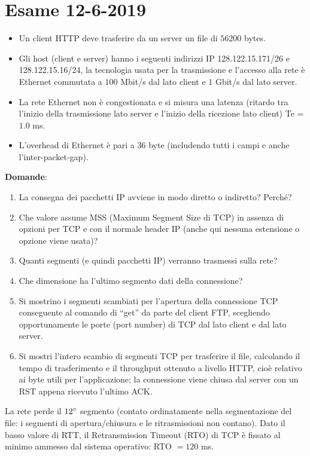 \documentclass[10pt]{article}
\begin{document}
	\section{Esame 12-6-2019}
	\begin{itemize}
	\item Un client HTTP deve trasferire da un server un file di $56200$ bytes. 
	\item Gli host (client e server) hanno i seguenti indirizzi IP 128.122.15.171/26 e 128.122.15.16/24, la tecnologia usata per la trasmissione e l'accesso alla rete è Ethernet commutata a $100$ Mbit/s dal lato client e $1$ Gbit/s dal lato server. 
	\item La rete Ethernet non è congestionata e si misura una latenza (ritardo tra l'inizio della trasmissione lato server e l'inizio della ricezione lato client) Te = $1.0$ ms. 
	\item L'overhead di Ethernet è pari a $36$ byte (includendo tutti i campi e anche l'inter-packet-gap).
	\end{itemize}
	\textbf{Domande}:
	\begin{enumerate}
		\item La consegna dei pacchetti IP avviene in modo diretto o indiretto? Perché?
		\item Che valore assume MSS (Maximum Segment Size di TCP) in assenza di opzioni per TCP e con il normale header IP (anche qui nessuna estensione o opzione viene usata)?
		\item Quanti segmenti (e quindi pacchetti IP) verranno trasmessi sulla rete?
		\item Che dimensione ha l'ultimo segmento dati della connessione?
		\item Si mostrino i segmenti scambiati per l'apertura della connessione TCP conseguente al comando di “get” da parte del client FTP, scegliendo opportunamente le porte (port number) di TCP dal lato client e dal lato server.
		\item Si mostri l'intero scambio di segmenti TCP per trasferire il file, calcolando il tempo di trasferimento e il throughput ottenuto a livello HTTP, cioè relativo ai byte utili per l'applicazione; la connessione viene chiusa dal server con un RST appena ricevuto l'ultimo ACK.
	\end{enumerate}
	La rete perde il $12 \degree$ segmento (contato ordinatamente nella segmentazione del file: i segmenti di apertura/chiusura e le ritrasmissioni non contano). Dato il basso valore di RTT, il Retransmission Timeout (RTO) di TCP è fissato al minimo ammesso dal sistema operativo: RTO $=120$ ms.
\end{document}
